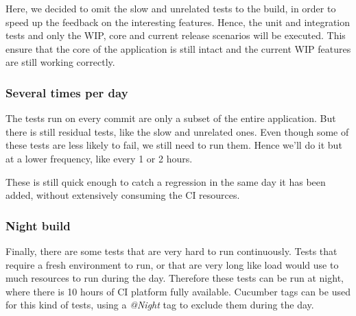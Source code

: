 Here, we decided to omit the slow and unrelated tests to the build, in order
to speed up the feedback on the interesting features.
Hence, the unit and integration tests and only the WIP, core and current
release scenarios will be executed.
This ensure that the core of the application is still intact and the current
WIP features are still working correctly.

\subsubsection{Several times per day}
The tests run on every commit are only a subset of the entire application.
But there is still residual tests, like the slow and unrelated ones.
Even though some of these tests are less likely to fail, we still need to run
them.
Hence we'll do it but at a lower frequency, like every 1 or 2 hours.

These is still quick enough to catch a regression in the same day it has been
added, without extensively consuming the CI resources.

\subsubsection{Night build}
Finally, there are some tests that are very hard to run continuously.
Tests that require a fresh environment to run, or that are very long like
load would use to much resources to run during the day.
Therefore these tests can be run at night, where there is 10 hours of CI
platform fully available.
Cucumber tags can be used for this kind of tests, using a \textit{@Night} tag
to exclude them during the day.
